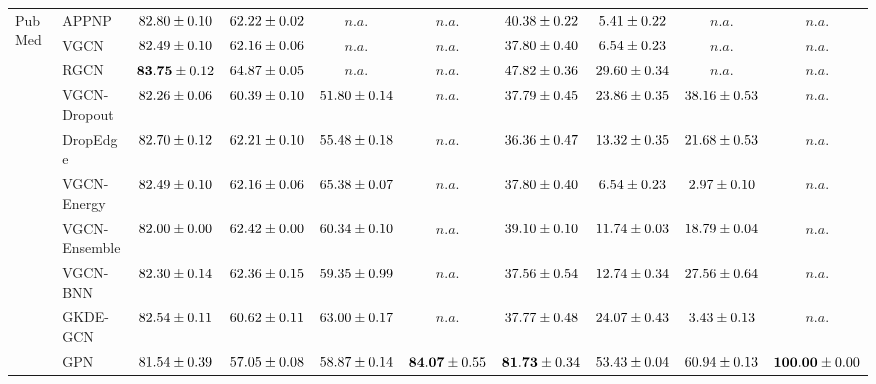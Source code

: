 \begin{table*}[!h]
{\begin{tabular}{ll|cccc|cccc}
        \midrule

        \multirow{10}{*}{PubMed}
        & APPNP & ${82.80\tiny \pm 0.10}$ & ${62.22\tiny \pm 0.02}$ & $n.a.$ & $n.a.$ & ${40.38\tiny \pm 0.22}$ & ${5.41\tiny \pm 0.22}$ & $n.a.$ & $n.a.$\\
        & VGCN & ${82.49\tiny \pm 0.10}$ & ${62.16\tiny \pm 0.06}$ & $n.a.$ & $n.a.$ & ${37.80\tiny \pm 0.40}$ & ${6.54\tiny \pm 0.23}$ & $n.a.$ & $n.a.$\\
        & RGCN & ${\mathbf{83.75}\tiny \pm 0.12}$ & ${64.87\tiny \pm 0.05}$ & $n.a.$ & $n.a.$ & ${47.82\tiny \pm 0.36}$ & ${29.60\tiny \pm 0.34}$ & $n.a.$ & $n.a.$\\
        & VGCN-Dropout & ${82.26\tiny \pm 0.06}$ & ${60.39\tiny \pm 0.10}$ & ${51.80\tiny \pm 0.14}$ & $n.a.$ & ${37.79\tiny \pm 0.45}$ & ${23.86\tiny \pm 0.35}$ & ${38.16\tiny \pm 0.53}$ & $n.a.$\\
        & DropEdge & ${82.70\tiny \pm 0.12}$ & ${62.21\tiny \pm 0.10}$ & ${55.48\tiny \pm 0.18}$ & $n.a.$ & ${36.36\tiny \pm 0.47}$ & ${13.32\tiny \pm 0.35}$ & ${21.68\tiny \pm 0.53}$ & $n.a.$\\
        & VGCN-Energy & ${82.49\tiny \pm 0.10}$ & ${62.16\tiny \pm 0.06}$ & ${65.38\tiny \pm 0.07}$ & $n.a.$ & ${37.80\tiny \pm 0.40}$ & ${6.54\tiny \pm 0.23}$ & ${2.97\tiny \pm 0.10}$ & $n.a.$\\
        & VGCN-Ensemble & ${82.00\tiny \pm 0.00}$ & ${62.42\tiny \pm 0.00}$ & ${60.34\tiny \pm 0.10}$ & $n.a.$ & ${39.10\tiny \pm 0.10}$ & ${11.74\tiny \pm 0.03}$ & ${18.79\tiny \pm 0.04}$ & $n.a.$\\
        & VGCN-BNN & ${82.30\tiny \pm 0.14}$ & ${62.36\tiny \pm 0.15}$ & ${59.35\tiny \pm 0.99}$ & $n.a.$ & ${37.56\tiny \pm 0.54}$ & ${12.74\tiny \pm 0.34}$ & ${27.56\tiny \pm 0.64}$ & $n.a.$\\
        & GKDE-GCN & ${82.54\tiny \pm 0.11}$ & ${60.62\tiny \pm 0.11}$ & ${63.00\tiny \pm 0.17}$ & $n.a.$ & ${37.77\tiny \pm 0.48}$ & ${24.07\tiny \pm 0.43}$ & ${3.43\tiny \pm 0.13}$ & $n.a.$\\
        & GPN & ${81.54\tiny \pm 0.39}$ & ${57.05\tiny \pm 0.08}$ & ${58.87\tiny \pm 0.14}$ & ${\mathbf{84.07}\tiny \pm 0.55}$ & ${\mathbf{81.73}\tiny \pm 0.34}$ & ${53.43\tiny \pm 0.04}$ & ${60.94\tiny \pm 0.13}$ & ${\mathbf{100.00}\tiny \pm 0.00}$\\
                

\end{tabular}}
\end{table*}
